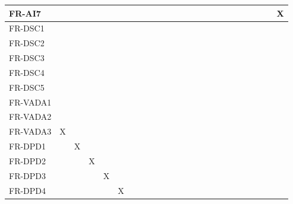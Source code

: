 \documentclass[12pt, titlepage]{article}
\begin{document}
\begin{table}[!ht]
{\begin{tabular}{|l|l|l|l|l|l|l|l|l|l|l|l|l|l|l|l|l|l|}
      FR-AI7 & ~ & ~ & ~ & ~ & ~ & ~ & ~ & ~ & ~ & ~ & ~ & ~ & ~ & ~ & ~ & ~ & X \\ \hline
      FR-DSC1 & ~ & ~ & ~ & ~ & ~ & ~ & ~ & ~ & ~ & ~ & ~ & ~ & ~ & ~ & ~ & ~ & ~ \\ \hline
      FR-DSC2 & ~ & ~ & ~ & ~ & ~ & ~ & ~ & ~ & ~ & ~ & ~ & ~ & ~ & ~ & ~ & ~ & ~ \\ \hline
      FR-DSC3 & ~ & ~ & ~ & ~ & ~ & ~ & ~ & ~ & ~ & ~ & ~ & ~ & ~ & ~ & ~ & ~ & ~ \\ \hline
      FR-DSC4 & ~ & ~ & ~ & ~ & ~ & ~ & ~ & ~ & ~ & ~ & ~ & ~ & ~ & ~ & ~ & ~ & ~ \\ \hline
      FR-DSC5 & ~ & ~ & ~ & ~ & ~ & ~ & ~ & ~ & ~ & ~ & ~ & ~ & ~ & ~ & ~ & ~ & ~ \\ \hline
      FR-VADA1 & ~ & ~ & ~ & ~ & ~ & ~ & ~ & ~ & ~ & ~ & ~ & ~ & ~ & ~ & ~ & ~ & ~ \\ \hline
      FR-VADA2 & ~ & ~ & ~ & ~ & ~ & ~ & ~ & ~ & ~ & ~ & ~ & ~ & ~ & ~ & ~ & ~ & ~ \\ \hline
      FR-VADA3 & X & ~ & ~ & ~ & ~ & ~ & ~ & ~ & ~ & ~ & ~ & ~ & ~ & ~ & ~ & ~ & ~ \\ \hline
      FR-DPD1 & ~ & X & ~ & ~ & ~ & ~ & ~ & ~ & ~ & ~ & ~ & ~ & ~ & ~ & ~ & ~ & ~ \\ \hline
      FR-DPD2 & ~ & ~ & X & ~ & ~ & ~ & ~ & ~ & ~ & ~ & ~ & ~ & ~ & ~ & ~ & ~ & ~ \\ \hline
      FR-DPD3 & ~ & ~ & ~ & X & ~ & ~ & ~ & ~ & ~ & ~ & ~ & ~ & ~ & ~ & ~ & ~ & ~ \\ \hline
      FR-DPD4 & ~ & ~ & ~ & ~ & X & ~ & ~ & ~ & ~ & ~ & ~ & ~ & ~ & ~ & ~ & ~ & ~ \\ \hline
  \end{tabular}
  }
\end{table}
\end{document}
